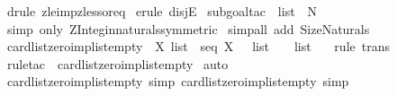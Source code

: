 \begin{isabellebody}
\isamarkupfalse%
\ {\isacharparenleft}drule\ zle{\isacharunderscore}imp{\isacharunderscore}zless{\isacharunderscore}or{\isacharunderscore}eq{\isacharparenright}\isanewline
{}\isamarkupfalse%
\ {\isacharparenleft}erule\ disjE{\isacharparenright}\isanewline
{}\isamarkupfalse%
\ {\isacharparenleft}subgoal{\isacharunderscore}tac\ {\isachardoublequoteopen}{\isacharhash}\ list\ {\isacharcolon}\ {\isacharpercent}N{\isachardoublequoteclose}{\isacharparenright}\isanewline
{}\isamarkupfalse%
\ {\isacharparenleft}simp\ only{\isacharcolon}\ ZInteg{\isachardot}in{\isacharunderscore}naturals{\isacharbrackleft}symmetric{\isacharbrackright}{\isacharparenright}\isanewline
{}\isamarkupfalse%
\ {\isacharparenleft}simp{\isacharunderscore}all\ add{\isacharcolon}\ Size{\isacharunderscore}Naturals{\isacharparenright}\isanewline
{}\isamarkupfalse%
%
\endisatagproof
{\isafoldproof}%
%
\isadelimproof
\isanewline
%
\endisadelimproof
\isanewline
{}\isamarkupfalse%
\ card{\isacharunderscore}list{\isacharunderscore}zero{\isacharunderscore}imp{\isacharunderscore}list{\isacharunderscore}empty{}{\isacharcolon}\ {\isachardoublequoteopen}{\isacharbang}{\isacharbang}\ X{\isachardot}\ list\ {\isacharcolon}\ seq\ X\ {\isacharequal}{\isacharequal}{\isachargreater}\ {\isacharparenleft}{\isacharhash}\ list\ {\isacharless}\ {}{\isacharparenright}\ {\isacharequal}\ {\isacharparenleft}list\ {\isacharequal}\ {\isacharpercent}{\isacharless}{\isacharpercent}{\isachargreater}{\isacharparenright}{\isachardoublequoteclose}\isanewline
%
\isadelimproof
%
\endisadelimproof
%
\isatagproof
{}\isamarkupfalse%
\ {\isacharparenleft}rule\ trans{\isacharparenright}\isanewline
{}\isamarkupfalse%
\ {\isacharparenleft}rule{\isacharunderscore}tac\ {\isacharbrackleft}{}{\isacharbrackright}\ card{\isacharunderscore}list{\isacharunderscore}zero{\isacharunderscore}imp{\isacharunderscore}list{\isacharunderscore}empty{}{\isacharparenright}\isanewline
{}\isamarkupfalse%
\ auto\isanewline
{}\isamarkupfalse%
%
\endisatagproof
{\isafoldproof}%
%
\isadelimproof
\isanewline
%
\endisadelimproof
\isanewline
\isanewline
\isanewline
{}\isamarkupfalse%
\ card{\isacharunderscore}list{\isacharunderscore}zero{\isacharunderscore}imp{\isacharunderscore}list{\isacharunderscore}empty\ {\isacharbrackleft}simp{\isacharbrackright}\ card{\isacharunderscore}list{\isacharunderscore}zero{\isacharunderscore}imp{\isacharunderscore}list{\isacharunderscore}empty{}\ {\isacharbrackleft}simp{\isacharbrackright}\ \isanewline

\end{isabellebody}
